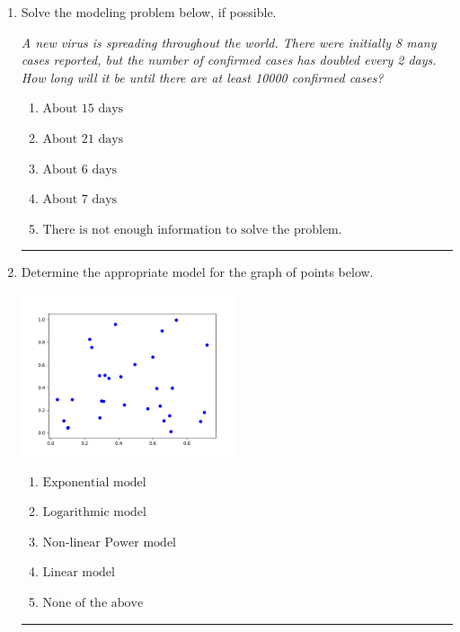 \documentclass[14pt]{extbook}
\newcommand{\litem}[1]{\item#1\hspace*{-1cm}\rule{\textwidth}{0.4pt}}
\begin{document}
\begin{enumerate}
\litem{
Solve the modeling problem below, if possible.
\begin{center}
    \textit{ A new virus is spreading throughout the world. There were initially 8 many cases reported, but the number of confirmed cases has doubled every 2 days. How long will it be until there are at least 10000 confirmed cases? }
\end{center}
\begin{enumerate}[label=\Alph*.]
\item \( \text{About } 15 \text{ days} \)
\item \( \text{About } 21 \text{ days} \)
\item \( \text{About } 6 \text{ days} \)
\item \( \text{About } 7 \text{ days} \)
\item \( \text{There is not enough information to solve the problem.} \)

\end{enumerate} }
\litem{
Determine the appropriate model for the graph of points below.
\begin{center}
    \includegraphics[width=0.5\textwidth]{../Figures/identifyModelGraph12CopyA.png}
\end{center}
\begin{enumerate}[label=\Alph*.]
\item \( \text{Exponential model} \)
\item \( \text{Logarithmic model} \)
\item \( \text{Non-linear Power model} \)
\item \( \text{Linear model} \)
\item \( \text{None of the above} \)


\end{enumerate}}
\end{enumerate}
\end{document}
